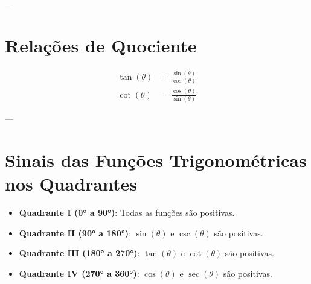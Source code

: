 \documentclass{article}
\begin{document}
---

\section*{Relações de Quociente}
\begin{align*}
    \tan(\theta) &= \frac{\sin(\theta)}{\cos(\theta)} \\
    \cot(\theta) &= \frac{\cos(\theta)}{\sin(\theta)}
\end{align*}

---

\section*{Sinais das Funções Trigonométricas nos Quadrantes}
\begin{itemize}
    \item \textbf{Quadrante I (0° a 90°)}: Todas as funções são positivas.
    \item \textbf{Quadrante II (90° a 180°)}: $\sin(\theta)$ e $\csc(\theta)$ são positivas.
    \item \textbf{Quadrante III (180° a 270°)}: $\tan(\theta)$ e $\cot(\theta)$ são positivas.
    \item \textbf{Quadrante IV (270° a 360°)}: $\cos(\theta)$ e $\sec(\theta)$ são positivas.
\end{itemize}
\end{document}
